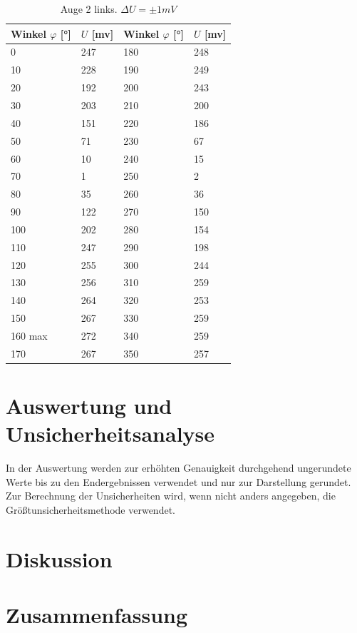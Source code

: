 \documentclass[12pt,a4paper,twoside]{article}
\begin{document}
\begin{table}[H]
    \centering
    \caption{Auge 2 links.  $\Delta U = \pm 1mV$}
    \label{tab:Messdaten Auge links}
    \begin{tabular}{| l | l | l | l |}
        \hline
        Winkel $\varphi$ [°] & $U$ [mv] & Winkel $\varphi$ [°] & $U$ [mv] \\
        \hline
        0    & 247  & 180   & 248  \\
        10   & 228  & 190   & 249  \\
        20   & 192  & 200   & 243  \\
        30   & 203  & 210   & 200  \\
        40   & 151  & 220   & 186  \\
        50   & 71   & 230   & 67   \\
        60   & 10   & 240   & 15   \\
        70   & 1    & 250   & 2    \\
        80   & 35   & 260   & 36   \\
        90   & 122  & 270   & 150  \\
        100  & 202  & 280   & 154  \\
        110  & 247  & 290   & 198  \\
        120  & 255  & 300   & 244  \\
        130  & 256  & 310   & 259  \\
        140  & 264  & 320   & 253  \\
        150  & 267  & 330   & 259  \\
        160 max & 272  & 340   & 259  \\
        170  & 267  & 350   & 257  \\
        \hline
    \end{tabular}
\end{table}

\section{Auswertung und Unsicherheitsanalyse} %

In der Auswertung werden zur erhöhten Genauigkeit durchgehend ungerundete Werte bis zu den Endergebnissen verwendet und nur zur Darstellung gerundet. \\
Zur Berechnung der Unsicherheiten wird, wenn nicht anders angegeben, die Größtunsicherheitsmethode verwendet.


\section{Diskussion} %


\section{Zusammenfassung} %



\printbibliography[heading=bibintoc]
\end{document}
